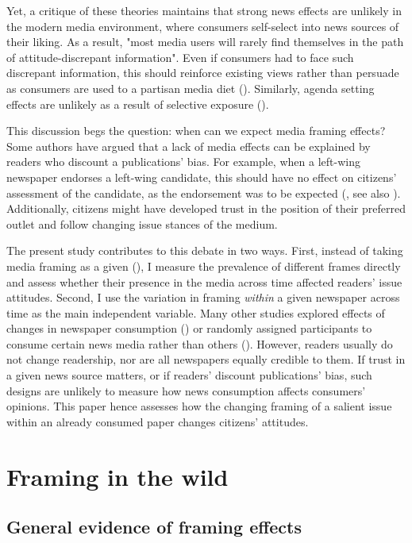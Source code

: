 \documentclass{article}
\begin{document}
Yet, a critique of these theories maintains that strong news effects are unlikely in the modern media environment, where consumers self-select into news sources of their liking. As a result, "most media users will rarely find themselves in the path of attitude-discrepant information". Even if consumers had to face such discrepant information, this should reinforce existing views rather than persuade as consumers are used to a partisan media diet (\cite[724f]{Bennett2008}). Similarly, agenda setting effects are unlikely as a result of selective exposure (\cite{Lau2021}).

This discussion begs the question: when can we expect media framing effects? Some authors have argued that a lack of media effects can be explained by readers who discount a publications' bias. For example, when a left-wing newspaper endorses a left-wing candidate, this should have no effect on citizens' assessment of the candidate, as the endorsement was to be expected (\cite{Chiang2011a}, see also \cite{Spirig2020}). Additionally, citizens might have developed trust in the position of their preferred outlet and follow changing issue stances of the medium.

The present study contributes to this debate in two ways. First, instead of taking media framing as a given (\cite{Foos2020, Guess2021}), I measure the prevalence of different frames directly and assess whether their presence in the media across time affected readers' issue attitudes. Second, I use the variation in framing \textit{within} a given newspaper across time as the main independent variable. Many other studies explored effects of changes in newspaper consumption (\cite{Foos2020, Gentzkow2011}) or randomly assigned participants to consume certain news media rather than others (\cite{Guess2021}). However, readers usually do not change readership, nor are all newspapers equally credible to them. If trust in a given news source matters, or if readers' discount publications' bias, such designs are unlikely to measure how news consumption affects consumers' opinions. This paper hence assesses how the changing framing of a salient issue within an already consumed paper changes citizens' attitudes. 

\section{Framing in the wild}

\subsection{General evidence of framing effects}
\end{document}
